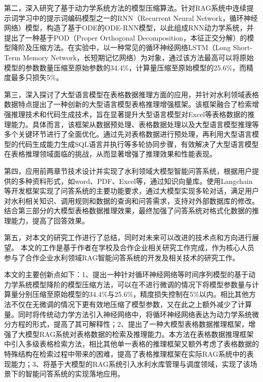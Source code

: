 第二，深入研究了基于动力学系统方法的模型压缩算法。针对RAG系统中连续提示词学习中的提示词编码模型之一的RNN（Recurrent Neural Network，循环神经网络）模型，构造了基于ODE的ODE-RNN模型，以此组成RNN动力学系统，并提出了一种基于POD（Proper Orthogonal Decomposition，本征正交分解）的模型降阶及压缩方法。在实验中，以一种常见的循环神经网络LSTM（Long Short-Term Memory Network，长短期记忆网络）为对象，通过该方法最高可以将原始模型的参数数量压缩至原始参数的34.4\%，计算量压缩至原始模型的25.6\%，而精度最多只损失5\%。

第三，深入探讨了大型语言模型在表格数据推理方面的应用，并针对水利领域表格数据特点提出了一种创新的大型语言模型表格推理增强框架。该框架融合了检索增强推理技术和代码生成技术，旨在显著提升大型语言模型对Excel等表格数据的推理能力。具体而言，该框架从数据预处理、表格数据处理以及大型语言模型推理等多个关键环节进行了全面优化。通过先对表格数据进行预处理，再利用大型语言模型的代码生成能力生成SQL语言并执行等多轮协同步骤，有效解决了大型语言模型在表格推理领域面临的挑战，从而显著增强了推理效果和性能表现。

第四，应用前两章节技术设计并实现了水利领域大模型智能问答系统，根据用户提供的多种资料形式，如word、PDF、Excel等，通过知识向量库。使用Langchain等开发框架实现了问答系统的主要功能要求，通过大模型实现多轮对话，满足用户对水利相关知识、调用规则和数据的查询和问答需求，支持对外部数据库的修改。结合第三部分的大模型表格数据推理效果，最终加强了问答系统对格式化数据的推理能力，提高了回答效果。

第五，对本文的研究工作进行了总结，同时对未来可以改进的技术点和方向进行展望。
本文的工作是基于作者在学校及合作企业相关研究工作完成，作为核心人员参与了合作企业水利领域RAG智能问答系统的开发及相关技术的研究工作。


本文的主要创新点如下：1、提出一种针对循环神经网络等时间序列模型的基于动力学系统模型降阶的模型压缩方法，可以在不进行微调的情况下将模型参数量与计算量分别压缩至原始模型的34.4\%与25.6\%，精度损失控制在5\%以内。相比其他方法不仅在无微调的情况下更有效地压缩了模型参数，又在此之上额外减少了计算量。同时将传统动力学方法引入神经网络中，将循环神经网络表达为动力学系统微分方程的形式，提高了其可解释性；2、提出了一种大模型表格数据推理框架，增强了大模型RAG系统对表格数据的检索及推理能力。本方法在表格数据推理框架中引入多级表格检索方法，相比其他单一表格的推理框架又额外考虑了表格数据的特殊结构在检索过程中带来的困难，提高了表格推理框架在实际RAG系统中的表现能力；3、将基于大模型的RAG系统引入水利水库管理与调度领域，实现了该场景下的智能问答系统的实现落地应用。

